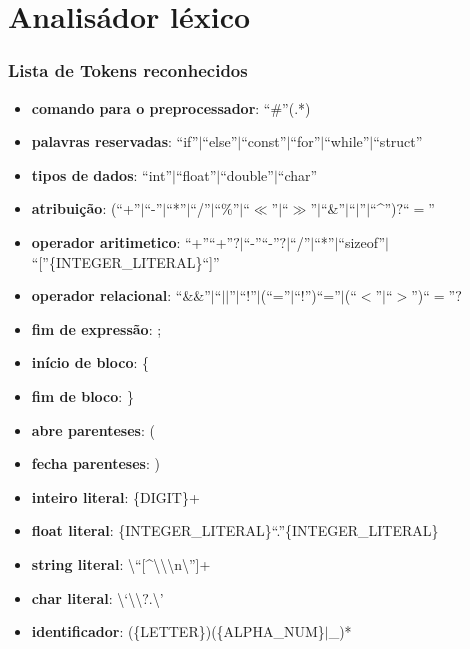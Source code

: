 \documentclass[12pt]{beamer}
\begin{document}
\section{Analisádor léxico}\label{Analisádor léxico}
\begin{frame}[allowframebreaks]
    \frametitle{Lista de Tokens reconhecidos}
    \begin{itemize}
        \item\textbf{comando para o preprocessador}: ``\#''(.*)
        \item\textbf{palavras reservadas}: ``if''$|$``else''$|$``const''$|$``for''$|$``while''$|$``struct''
        \item\textbf{tipos de dados}: ``int''$|$``float''$|$``double''$|$``char''
        \item\textbf{atribuição}: (``+''$|$``-''$|$``*''$|$``/''$|$``\%''$|$``$\ll$''$|$``$\gg$''$|$``\&''$|$``$|$''$|$``^'')$?$``$=$''
        \item\textbf{operador aritimetico}: ``+''``+''$?|$``-''``-''$?|$``/''$|$``*''$|$``sizeof''$|$``[''\{INTEGER\_LITERAL\}``]''
        \item\textbf{operador relacional}: ``\&\&''$|$``$||$''$|$``!''$|$(``=''$|$``!'')``=''$|$(``$<$''$|$``$>$'')``$=$''$?$
        \item\textbf{fim de expressão}: ;
        \item\textbf{início de bloco}: \{
        \item\textbf{fim de bloco}: \}
        \item\textbf{abre parenteses}: (
        \item\textbf{fecha parenteses}: )
        \item\textbf{inteiro literal}: \{DIGIT\}+
        \item\textbf{float literal}: \{INTEGER\_LITERAL\}``.''\{INTEGER\_LITERAL\}
        \item\textbf{string literal}: \textbackslash{}``[\^{}\textbackslash{}\textbackslash{}\textbackslash{}n\textbackslash{}'']+
        \item\textbf{char literal}: \textbackslash{}`\textbackslash{}\textbackslash{}$?$.\textbackslash{}'
        \item\textbf{identificador}: (\{LETTER\})(\{ALPHA\_NUM\}$|$\_)*
    \end{itemize}
\end{frame}
\end{document}
